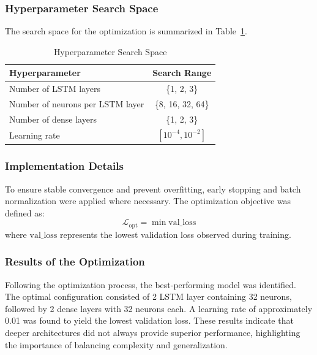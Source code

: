 \documentclass[3p]{elsarticle}
\begin{document}
\subsubsection{Hyperparameter Search Space}
The search space for the optimization is summarized in Table~\ref{tab:hyperparameters}.

\begin{table}[H]
    \centering
    \caption{Hyperparameter Search Space}
    \label{tab:hyperparameters}
    \begin{tabular}{l c}
        \hline
        \textbf{Hyperparameter} & \textbf{Search Range} \\
        \hline
        Number of LSTM layers & \{1, 2, 3\} \\
        Number of neurons per LSTM layer & \{8, 16, 32, 64\} \\
        Number of dense layers & \{1, 2, 3\} \\
        Learning rate & $[10^{-4}, 10^{-2}]$ \\
        \hline
    \end{tabular}
\end{table}

\subsubsection{Implementation Details}
To ensure stable convergence and prevent overfitting, early stopping and batch normalization were applied where necessary. The optimization objective was defined as:
\begin{equation}
    \mathcal{L}_{\text{opt}} = \min \text{val\_loss}
\end{equation}
where $\text{val\_loss}$ represents the lowest validation loss observed during training.



\subsubsection{Results of the Optimization}
Following the optimization process, the best-performing model was identified. The optimal configuration consisted of 2 LSTM layer containing 32 neurons, followed by 2 dense layers with 32 neurons each. A learning rate of approximately 0.01 was found to yield the lowest validation loss. These results indicate that deeper architectures did not always provide superior performance, highlighting the importance of balancing complexity and generalization.
\end{document}

